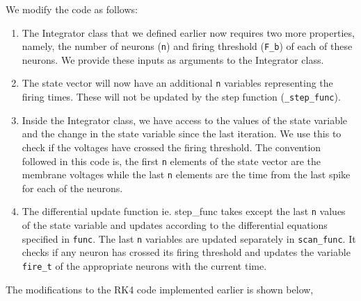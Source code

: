 \documentclass[10pt,letterpaper]{article}
\begin{document}
We modify the code as follows:
\begin{enumerate}
\item The Integrator class that we defined earlier now requires two more properties, namely, the number of neurons (\texttt{n}) and firing threshold (\texttt{F\_b}) of each of these neurons. We provide these inputs as arguments to the Integrator class.
\item The state vector will now have an additional \texttt{n} variables representing the firing times. These will not be updated by the step function (\texttt{\_step\_func}).
\item Inside the Integrator class, we have access to the values of the state variable and the change in the state variable since the last iteration. We use this to check if the voltages have crossed the firing threshold. The convention followed in this code is, the first \texttt{n} elements of the state vector are the membrane voltages while the last \texttt{n} elements are the time from the last spike for each of the neurons.
\item The differential update function ie. step\_func takes except the last \texttt{n} values of the state variable and updates according to the differential equations specified in \texttt{func}. The last \texttt{n} variables are updated separately in \texttt{scan\_func}. It checks if any neuron has crossed its firing threshold and updates the variable \texttt{fire\_t} of the appropriate neurons with the current time.
\end{enumerate}

The modifications to the RK4 code implemented earlier is shown below,
\end{document}
